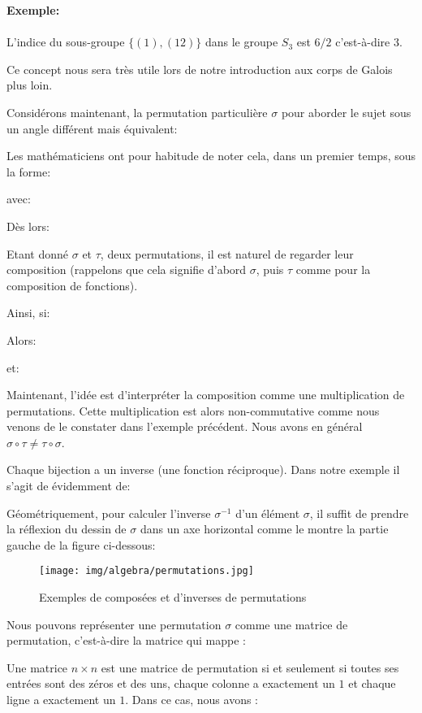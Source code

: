 	\begin{tcolorbox}[colframe=black,colback=white,sharp corners]
	\textbf{{\Large {}}Exemple:}\\\\
	L'indice du sous-groupe $\{(1), (1 2)\}$ dans le groupe $S_3$ est $6/2$ c'est-à-dire $3$.
	\end{tcolorbox}
	 Ce concept nous sera très utile lors de notre introduction aux corps de Galois plus loin.
	
	Considérons maintenant, la permutation particulière $\sigma$ pour aborder le sujet sous un angle différent mais équivalent:
	
	Les mathématiciens ont pour habitude de noter cela, dans un premier temps, sous la forme:
	 
	avec:
	
	Dès lors:
	 
	Etant donné $\sigma$ et $\tau$, deux permutations, il est naturel de regarder leur composition (rappelons que cela signifie d'abord $\sigma$, puis $\tau$ comme pour la composition de fonctions).
	
	Ainsi, si:
	
	Alors:
	
	et:
	
	Maintenant, l'idée est d'interpréter la composition comme une multiplication de permutations. Cette multiplication est alors non-commutative comme nous venons de le constater dans l'exemple précédent. Nous avons en général $\sigma \circ \tau \neq \tau \circ \sigma$.
	
	Chaque bijection a un inverse (une fonction réciproque). Dans notre exemple il s'agit de évidemment de:
	
	Géométriquement, pour calculer l'inverse $\sigma^{-1}$ d'un élément $\sigma$, il suffit de prendre la réflexion du dessin de $\sigma$ dans un axe horizontal comme le montre la partie gauche de la figure ci-dessous:
	\begin{figure}[H]
		\centering
		\texttt{[image: img/algebra/permutations.jpg]}
		\caption{Exemples de composées et d'inverses de permutations}
	\end{figure}
	Nous pouvons représenter une permutation $\sigma$ comme une matrice de permutation, c'est-à-dire la matrice qui mappe :
	
	Une matrice $n\times n$ est une matrice de permutation si et seulement si toutes ses entrées sont des zéros et des uns, chaque colonne a exactement un $1$ et chaque ligne a exactement un $1$. Dans ce cas, nous avons :
	 
